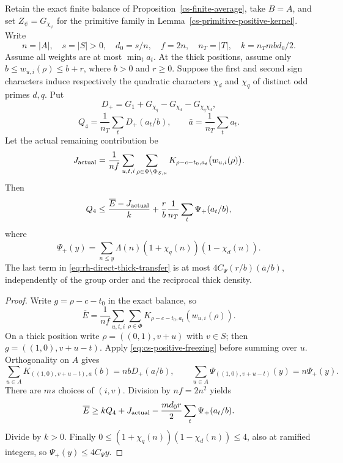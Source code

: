 \begin{proposition}
\label{rh-direct-thick-transfer}
Retain the exact finite balance of Proposition~\ref{cs-finite-average},
take $B=A$, and set $Z_\psi=G_{\chi_\psi}$ for the primitive family
in Lemma~\ref{cs-primitive-positive-kernel}. Write
\[
 n=|A|,\quad s=|S|>0,\quad d_0=s/n,\quad f=2n,\quad
 n_T=|T|,\quad k=n_Tmbd_0/2.
\]
Assume all weights are at most $\min_ta_t$. At the thick positions,
assume only $b\le w_{u,i}(\rho)\le b+r$, where $b>0$ and $r\ge0$.
Suppose the first and second sign characters induce respectively
the quadratic characters $\chi_d$ and $\chi_q$ of distinct odd
primes $d,q$. Put
\[
 D_+=G_1+G_{\chi_q}-G_{\chi_d}-G_{\chi_q\chi_d},
\]
\[
 Q_4=\frac1{n_T}\sum_tD_+(a_t/b),\qquad
 \bar a=\frac1{n_T}\sum_ta_t.
\]
Let the actual remaining contribution be
\[
 J_{\rm actual}=\frac1{nf}\sum_{u,t,i}
       \sum_{\rho\in\Phi\setminus\Phi_{S,u}}
       K_{\rho-c-t_0,a_t}\bigl(w_{u,i}(\rho)\bigr).
\]
Then
\begin{equation}\label{eq:rh-direct-thick-transfer}
 Q_4\le\frac{\overline E-J_{\rm actual}}k
       +\frac rb\frac1{n_T}\sum_t\Psi_+(a_t/b),
\end{equation}
where
\[
 \Psi_+(y)=\sum_{n\le y}\Lambda(n)
                  (1+\chi_q(n))(1-\chi_d(n)).
\]
The last term in \eqref{eq:rh-direct-thick-transfer} is at most
$4C_\Psi(r/b)(\bar a/b)$, independently of the group order and
the reciprocal thick density.
\end{proposition}
\begin{proof}
Write $g=\rho-c-t_0$ in the exact balance, so
\[
 \overline E=\frac1{nf}\sum_{u,t,i}\sum_{\rho\in\Phi}
                     K_{\rho-c-t_0,a_t}(w_{u,i}(\rho)).
\]
On a thick position write $\rho=((0,1),v+u)$ with $v\in S$;
then $g=((1,0),v+u-t)$. Apply \eqref{eq:cs-positive-freezing}
before summing over $u$. Orthogonality on $A$ gives
\[
 \sum_{u\in A}K_{((1,0),v+u-t),a}(b)=nbD_+(a/b),
 \qquad
 \sum_{u\in A}\Psi_{((1,0),v+u-t)}(y)=n\Psi_+(y).
\]
There are $ms$ choices of $(i,v)$. Division by $nf=2n^2$ yields
\[
 \overline E\ge kQ_4+J_{\rm actual}
                   -\frac{md_0r}{2}\sum_t\Psi_+(a_t/b).
\]
Divide by $k>0$. Finally
$0\le(1+\chi_q(n))(1-\chi_d(n))\le4$, also at ramified
integers, so $\Psi_+(y)\le4C_\Psi y$.
\end{proof}

